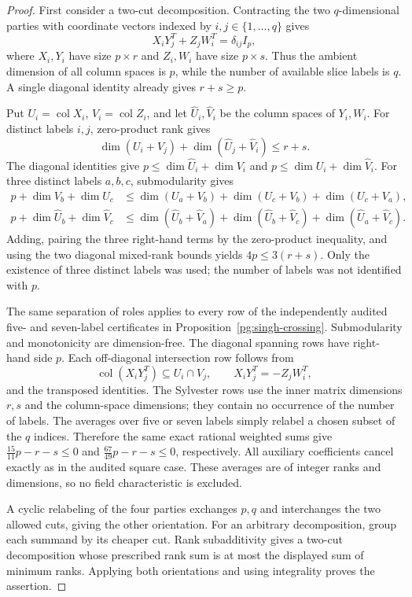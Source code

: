 \begin{proof}
First consider a two-cut decomposition. Contracting the two
$q$-dimensional parties with coordinate vectors indexed by
$i,j\in\{1,\ldots,q\}$ gives
\[
 X_iY_j^T+Z_jW_i^T=\delta_{ij}I_p,
 \tag{PG-SINGH-rectangular-slices}
\]
where $X_i,Y_i$ have size $p\times r$ and $Z_i,W_i$ have size
$p\times s$. Thus the ambient dimension of all column spaces is
$p$, while the number of available slice labels is $q$.
A single diagonal identity already gives $r+s\geq p$.

Put $U_i=\operatorname{col}X_i$, $V_i=\operatorname{col}Z_i$,
and let $\widehat U_i,\widehat V_i$ be the column spaces of
$Y_i,W_i$. For distinct labels $i,j$, zero-product rank gives
\[
 \dim(U_i+V_j)+\dim(\widehat U_j+\widehat V_i)\leq r+s.
\]
The diagonal identities give
$p\leq\dim\widehat U_i+\dim V_i$ and
$p\leq\dim U_i+\dim\widehat V_i$.
For three distinct labels $a,b,c$, submodularity gives
\begin{align*}
 p+\dim V_b+\dim U_c
 &\leq\dim(U_a+V_b)+\dim(U_c+V_b)+\dim(U_c+V_a),\\
 p+\dim\widehat U_b+\dim\widehat V_c
 &\leq\dim(\widehat U_b+\widehat V_a)
       +\dim(\widehat U_b+\widehat V_c)
       +\dim(\widehat U_a+\widehat V_c).
\end{align*}
Adding, pairing the three right-hand terms by the zero-product
inequality, and using the two diagonal mixed-rank bounds yields
$4p\leq3(r+s)$. Only the existence of three distinct labels was
used; the number of labels was not identified with $p$.

The same separation of roles applies to every row of the
independently audited five- and seven-label certificates in
Proposition~\ref{pg:singh-crossing}. Submodularity and monotonicity
are dimension-free. The diagonal spanning rows have right-hand
side $p$. Each off-diagonal intersection row follows from
\[
 \operatorname{col}(X_iY_j^T)\subseteq U_i\cap V_j,
 \qquad X_iY_j^T=-Z_jW_i^T,
\]
and the transposed identities. The Sylvester rows use the inner
matrix dimensions $r,s$ and the column-space dimensions; they
contain no occurrence of the number of labels. The averages over
five or seven labels simply relabel a chosen subset of the $q$
indices. Therefore the same exact rational weighted sums give
$\tfrac{15}{11}p-r-s\leq0$ and
$\tfrac{67}{49}p-r-s\leq0$, respectively. All auxiliary
coefficients cancel exactly as in the audited square case.
These averages are of integer ranks and dimensions, so no field
characteristic is excluded.

A cyclic relabeling of the four parties exchanges $p,q$ and
interchanges the two allowed cuts, giving the other orientation.
For an arbitrary decomposition, group each summand by its
cheaper cut. Rank subadditivity gives a two-cut decomposition
whose prescribed rank sum is at most the displayed sum of
minimum ranks. Applying both orientations and using integrality
proves the assertion.
\end{proof}

